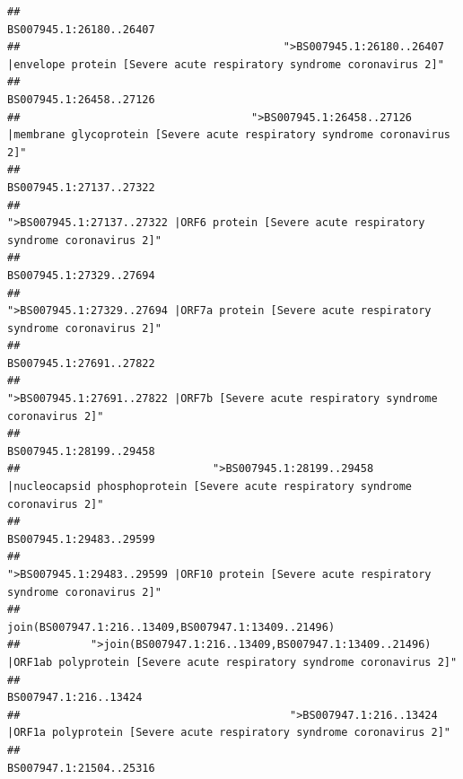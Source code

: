 \documentclass[
]{article}
\begin{document}
\begin{verbatim}
##                                                                                                                BS007945.1:26180..26407 
##                                         ">BS007945.1:26180..26407 |envelope protein [Severe acute respiratory syndrome coronavirus 2]" 
##                                                                                                                BS007945.1:26458..27126 
##                                    ">BS007945.1:26458..27126 |membrane glycoprotein [Severe acute respiratory syndrome coronavirus 2]" 
##                                                                                                                BS007945.1:27137..27322 
##                                             ">BS007945.1:27137..27322 |ORF6 protein [Severe acute respiratory syndrome coronavirus 2]" 
##                                                                                                                BS007945.1:27329..27694 
##                                            ">BS007945.1:27329..27694 |ORF7a protein [Severe acute respiratory syndrome coronavirus 2]" 
##                                                                                                                BS007945.1:27691..27822 
##                                                    ">BS007945.1:27691..27822 |ORF7b [Severe acute respiratory syndrome coronavirus 2]" 
##                                                                                                                BS007945.1:28199..29458 
##                              ">BS007945.1:28199..29458 |nucleocapsid phosphoprotein [Severe acute respiratory syndrome coronavirus 2]" 
##                                                                                                                BS007945.1:29483..29599 
##                                            ">BS007945.1:29483..29599 |ORF10 protein [Severe acute respiratory syndrome coronavirus 2]" 
##                                                                                    join(BS007947.1:216..13409,BS007947.1:13409..21496) 
##           ">join(BS007947.1:216..13409,BS007947.1:13409..21496) |ORF1ab polyprotein [Severe acute respiratory syndrome coronavirus 2]" 
##                                                                                                                  BS007947.1:216..13424 
##                                          ">BS007947.1:216..13424 |ORF1a polyprotein [Severe acute respiratory syndrome coronavirus 2]" 
##                                                                                                                BS007947.1:21504..25316 

\end{verbatim}
\end{document}
